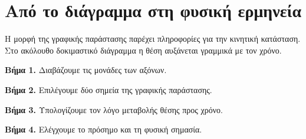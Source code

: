 \section{Από το διάγραμμα στη φυσική ερμηνεία}
Η μορφή της γραφικής παράστασης παρέχει πληροφορίες για την κινητική κατάσταση. Στο ακόλουθο δοκιμαστικό διάγραμμα η θέση αυξάνεται γραμμικά με τον χρόνο.
\begin{center}
\end{center}
\begin{MethodBox}
\textbf{Βήμα 1.} Διαβάζουμε τις μονάδες των αξόνων.\par
\textbf{Βήμα 2.} Επιλέγουμε δύο σημεία της γραφικής παράστασης.\par
\textbf{Βήμα 3.} Υπολογίζουμε τον λόγο μεταβολής θέσης προς χρόνο.\par
\textbf{Βήμα 4.} Ελέγχουμε το πρόσημο και τη φυσική σημασία.
\end{MethodBox}

